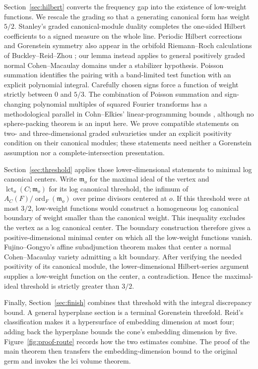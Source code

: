 \documentclass[11pt]{article}
\theoremstyle{definition}
\theoremstyle{remark}
\numberwithin{equation}{section}
\newcommand{\m}{\mathfrak m}
\newcommand{\ord}{\operatorname{ord}}
\newcommand{\lct}{\operatorname{lct}}
\begin{document}
Section~\ref{sec:hilbert} converts the frequency gap into the existence of low-weight functions. We rescale the grading so that a generating canonical form has weight \(5/2\). Stanley's graded canonical-module duality \cite{Stanley} completes the one-sided Hilbert coefficients to a signed measure on the whole line. Periodic Hilbert corrections and Gorenstein symmetry also appear in the orbifold Riemann--Roch calculations of Buckley--Reid--Zhou \cite[Theorem~1.3 and Section~2.4]{BRZ}; our lemma instead applies to general positively graded normal Cohen--Macaulay domains under a stabilizer hypothesis. Poisson summation identifies the pairing with a band-limited test function with an explicit polynomial integral. Carefully chosen signs force a function of weight strictly between \(0\) and \(5/3\). The combination of Poisson summation and sign-changing polynomial multiples of squared Fourier transforms has a methodological parallel in Cohn--Elkies' linear-programming bounds \cite[Sections~3 and~6]{CohnElkies}, although no sphere-packing theorem is an input here. We prove compatible statements on two- and three-dimensional graded subvarieties under an explicit positivity condition on their canonical modules; these statements need neither a Gorenstein assumption nor a complete-intersection presentation.

Section~\ref{sec:threshold} applies those lower-dimensional statements to minimal log canonical centers. Write \(\m_o\) for the maximal ideal of the vertex and \(\lct_o(C;\m_o)\) for its log canonical threshold, the infimum of \(A_C(F)/\ord_F(\m_o)\) over prime divisors centered at \(o\). If this threshold were at most \(3/2\), low-weight functions would construct a homogeneous log canonical boundary of weight smaller than the canonical weight. This inequality excludes the vertex as a log canonical center. The boundary construction therefore gives a positive-dimensional minimal center on which all the low-weight functions vanish. Fujino--Gongyo's affine subadjunction theorem \cite{FG} makes that center a normal Cohen--Macaulay variety admitting a klt boundary. After verifying the needed positivity of its canonical module, the lower-dimensional Hilbert-series argument supplies a low-weight function on the center, a contradiction. Hence the maximal-ideal threshold is strictly greater than \(3/2\).

Finally, Section~\ref{sec:finish} combines that threshold with the integral discrepancy bound. A general hyperplane section is a terminal Gorenstein threefold. Reid's classification \cite{Reid} makes it a hypersurface of embedding dimension at most four; adding back the hyperplane bounds the cone's embedding dimension by five. Figure~\ref{fig:proof-route} records how the two estimates combine. The proof of the main theorem then transfers the embedding-dimension bound to the original germ and invokes the lci volume theorem.
\end{document}

